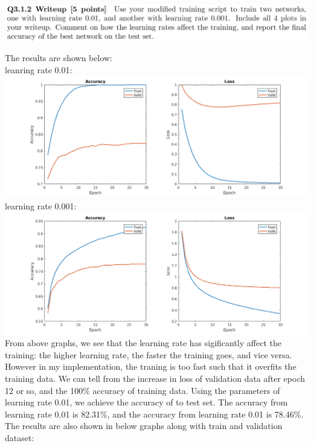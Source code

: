 \documentclass[12pt,letterpaper,boxed]{hmcpset}
\begin{document}
\begin{problem}[]
\includegraphics[width=\textwidth]{3_1_2.png}
\end{problem}

\begin{solution}
The results are shown below:\\
leanring rate 0.01:\\
\includegraphics[width=\textwidth]{3_1_2_1.png}\\
learning rate 0.001:\\
\includegraphics[width=\textwidth]{3_1_2_2.png}\\
From above graphs, we see that the learning rate has sigificantly affect the training: the higher
learning rate, the faster the training goes, and vice versa. However in my implementation, the traning is too fast such
that it overfits the training data. We can tell from the increase in loss of validation data after epoch 12 or so, 
and the 100\% accuracy of training data. Using the parameters of learning rate 0.01, we achieve the accuracy
of  to test set. 
\newpage
The accuracy from learning rate 0.01 is 82.31\%, and the accuracy from learning rate 0.01 is 78.46\%.
The results are also shown in below graphs along with train and validation dataset:\\

\end{solution}
\end{document}
